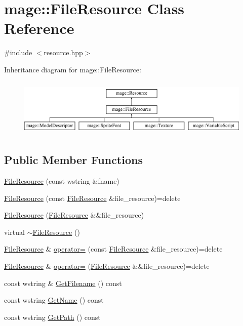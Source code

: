 \hypertarget{classmage_1_1_file_resource}{}\section{mage\+:\+:File\+Resource Class Reference}
\label{classmage_1_1_file_resource}


{\ttfamily \#include $<$resource.\+hpp$>$}

Inheritance diagram for mage\+:\+:File\+Resource\+:\begin{figure}[H]
\begin{center}
\leavevmode
\includegraphics[height=2.800000cm]{classmage_1_1_file_resource}
\end{center}
\end{figure}
\subsection*{Public Member Functions}
\begin{DoxyCompactItemize}
\item 
\hyperlink{classmage_1_1_file_resource_ab126d9301d81c55b2aaacff86437e2d4}{File\+Resource} (const wstring \&fname)
\item 
\hyperlink{classmage_1_1_file_resource_a5aa20ee42fcfc4ee6877438ed7377930}{File\+Resource} (const \hyperlink{classmage_1_1_file_resource}{File\+Resource} \&file\+\_\+resource)=delete
\item 
\hyperlink{classmage_1_1_file_resource_a8022b27741face9debe1e8ccb1bc54e3}{File\+Resource} (\hyperlink{classmage_1_1_file_resource}{File\+Resource} \&\&file\+\_\+resource)
\item 
virtual \hyperlink{classmage_1_1_file_resource_a864fc0373785b1d5a82fecdc3aee7e46}{$\sim$\+File\+Resource} ()
\item 
\hyperlink{classmage_1_1_file_resource}{File\+Resource} \& \hyperlink{classmage_1_1_file_resource_a195da42fa3a40991e7c38cf8305b0bf2}{operator=} (const \hyperlink{classmage_1_1_file_resource}{File\+Resource} \&file\+\_\+resource)=delete
\item 
\hyperlink{classmage_1_1_file_resource}{File\+Resource} \& \hyperlink{classmage_1_1_file_resource_a7ec207d6e9cb0bc4b8020aa73df986b6}{operator=} (\hyperlink{classmage_1_1_file_resource}{File\+Resource} \&\&file\+\_\+resource)=delete
\item 
const wstring \& \hyperlink{classmage_1_1_file_resource_a5930e472973b3e0d9b09dc9d031bacf1}{Get\+Filename} () const
\item 
const wstring \hyperlink{classmage_1_1_file_resource_a8bc3308e018b352157bbcfe3a85519f9}{Get\+Name} () const
\item 
const wstring \hyperlink{classmage_1_1_file_resource_a6dd2da5d50dbe8b3ac4189cdaa5fc325}{Get\+Path} () const
\end{DoxyCompactItemize}


